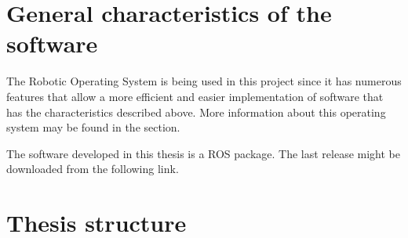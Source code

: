 \section*{General characteristics of the software}

The Robotic Operating System is being used in this project since it has numerous features that allow a more efficient and 
easier implementation of software that has the characteristics described above. More information about this operating 
system may be found in the section.

The software developed in this thesis is a ROS package. The last release might be downloaded from the following link. 


\section*{ Thesis structure}
